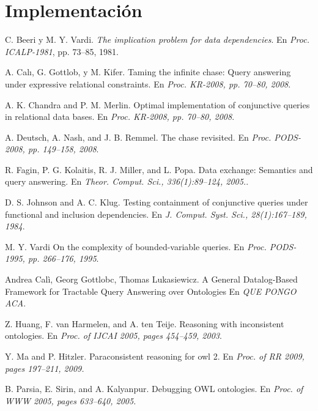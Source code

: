 \documentclass[11pt,a4paper,twoside]{tesis}
\begin{document}

\chapter{Implementación}

\backmatter
\begin{thebibliography}{9}
    C. Beeri y M. Y. Vardi.
    \textit{The implication problem for data dependencies}. 
    En \textit{Proc. ICALP-1981}, pp. 73–85, 1981.
     
    A. Calı, G. Gottlob, y M. Kifer.
    Taming the infinite chase: Query answering under expressive relational constraints.
    En \textit{Proc. KR-2008, pp. 70–80, 2008}. 

    A. K. Chandra and P. M. Merlin. 
    Optimal implementation of conjunctive queries in relational data bases.
    En \textit{Proc. KR-2008, pp. 70–80, 2008}. 

    A. Deutsch, A. Nash, and J. B. Remmel.
    The chase revisited.
    En \textit{Proc. PODS-2008, pp. 149–158, 2008}. 

    R. Fagin, P. G. Kolaitis, R. J. Miller, and L. Popa.
    Data exchange: Semantics and query answering.
    En \textit{Theor. Comput. Sci., 336(1):89–124, 2005.}. 

    D. S. Johnson and A. C. Klug.
    Testing containment of conjunctive queries under functional and inclusion dependencies.
    En \textit{J. Comput. Syst. Sci., 28(1):167–189, 1984}. 

    M. Y. Vardi
    On the complexity of bounded-variable queries.
    En \textit{Proc. PODS-1995, pp. 266–176, 1995}. 
    
    Andrea Calì, Georg Gottlobc, Thomas Lukasiewicz.
    A General Datalog-Based Framework for Tractable Query Answering over Ontologies
    En \textit{QUE PONGO ACA}. 
    
    Z. Huang, F. van Harmelen, and A. ten Teije.
    Reasoning with inconsistent ontologies.
    En \textit{Proc. of IJCAI 2005, pages 454–459, 2003}. 
    
    Y. Ma and P. Hitzler.
    Paraconsistent reasoning for owl 2.
    En \textit{Proc. of RR 2009, pages 197–211, 2009.} 
    
    B. Parsia, E. Sirin, and A. Kalyanpur.
    Debugging OWL ontologies.
    En \textit{Proc. of WWW 2005, pages 633–640, 2005.} 


\end{thebibliography}
\end{document}
